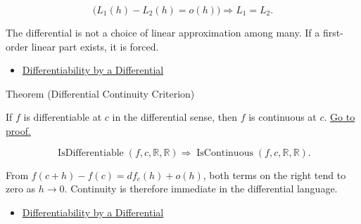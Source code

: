 \begin{remark*}
\[
  \bigl(L_1(h)-L_2(h)=o(h)\bigr)\Longrightarrow L_1=L_2.
\]
\end{remark*}

\begin{remark*}[Interpretation]
The differential is not a choice of linear approximation among many. If a first-order linear part exists, it is forced.
\end{remark*}

\begin{dependencies}
\begin{itemize}
  \item \hyperref[def:differentiability-by-a-differential]{Differentiability by a Differential}
\end{itemize}
\end{dependencies}

\begin{theorembox}{Theorem (Differential Continuity Criterion)}
\begin{theorem}
\label{thm:differential-continuity-criterion}
If $f$ is differentiable at $c$ in the differential sense, then $f$ is continuous at $c$.
\hyperref[prf:differential-continuity-criterion]{Go to proof.}
\end{theorem}
\end{theorembox}

\begin{remark*}
\[
  \operatorname{IsDifferentiable}(f,c,\mathbb{R},\mathbb{R})
  \Longrightarrow
  \operatorname{IsContinuous}(f,c,\mathbb{R},\mathbb{R}).
\]
\end{remark*}

\begin{remark*}[Interpretation]
From $f(c+h)-f(c)=df_c(h)+o(h)$, both terms on the right tend to zero as $h\to 0$. Continuity is therefore immediate in the differential language.
\end{remark*}

\begin{dependencies}
\begin{itemize}
  \item \hyperref[def:differentiability-by-a-differential]{Differentiability by a Differential}
\end{itemize}
\end{dependencies}


